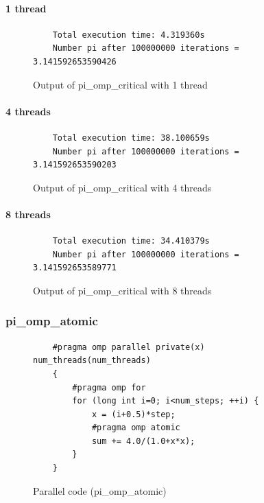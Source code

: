 \documentclass[12pt, a4paper]{article}
\begin{document}
\paragraph{1 thread}

\begin{figure}[H]
	\begin{lstlisting}
	Total execution time: 4.319360s
	Number pi after 100000000 iterations = 3.141592653590426		
	\end{lstlisting}
	\caption{Output of pi\_omp\_critical with 1 thread}
\end{figure}

\paragraph{4 threads}

\begin{figure}[H]
	\begin{lstlisting}
	Total execution time: 38.100659s
	Number pi after 100000000 iterations = 3.141592653590203		
	\end{lstlisting}
	\caption{Output of pi\_omp\_critical with 4 threads}
\end{figure}

\paragraph{8 threads}

\begin{figure}[H]
	\begin{lstlisting}
	Total execution time: 34.410379s
	Number pi after 100000000 iterations = 3.141592653589771		
	\end{lstlisting}
	\caption{Output of pi\_omp\_critical with 8 threads}
\end{figure}

\subsubsection{pi\_omp\_atomic}

\begin{figure}[H]
	\begin{lstlisting}
	#pragma omp parallel private(x) num_threads(num_threads)
    {
        #pragma omp for 
        for (long int i=0; i<num_steps; ++i) {
            x = (i+0.5)*step;
            #pragma omp atomic 
	    	sum += 4.0/(1.0+x*x);
        }
    }
	\end{lstlisting}
	
	\caption{Parallel code (pi\_omp\_atomic)}
\end{figure}
\end{document}
